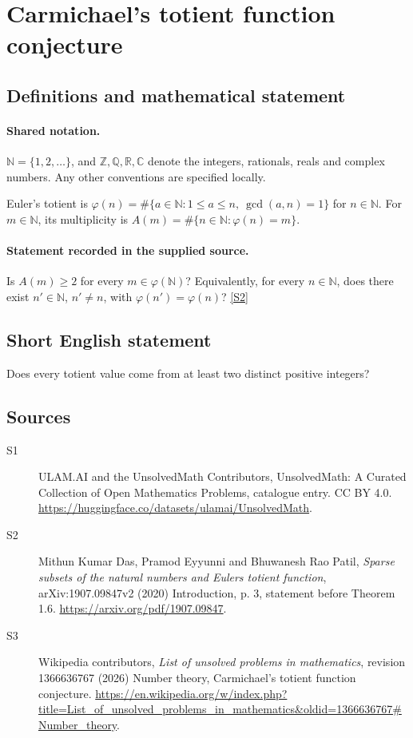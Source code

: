 \documentclass[11pt]{article}
\newcommand{\sref}[2]{\hyperlink{source:#1:#2}{[S#2]}}
\begin{document}
\section{Carmichael's totient function conjecture}\label{statement}

\subsection{Definitions and mathematical statement}

\paragraph{Shared notation.}$\mathbb N=\{1,2,\ldots\}$, and $\mathbb Z,\mathbb Q,\mathbb R,\mathbb C$ denote the integers, rationals, reals and complex numbers. Any other conventions are specified locally.


Euler's totient is $\varphi(n)=\#\{a\in\mathbb N:1\le a\le n,\ \gcd(a,n)=1\}$ for $n\in\mathbb N$. For $m\in\mathbb N$, its multiplicity is $A(m)=\#\{n\in\mathbb N:\varphi(n)=m\}$.
\paragraph{Statement recorded in the supplied source.}
Is $A(m)\ge2$ for every $m\in\varphi(\mathbb N)$? Equivalently, for every $n\in\mathbb N$, does there exist $n'\in\mathbb N$, $n'\ne n$, with $\varphi(n')=\varphi(n)$? \sref{statement}{2}
\subsection{Short English statement}
Does every totient value come from at least two distinct positive integers?
\subsection{Sources}
\begin{description}
\item[\hypertarget{source:statement:1}{S1}] ULAM.AI and the UnsolvedMath Contributors, UnsolvedMath: A Curated Collection of Open Mathematics Problems, catalogue entry. CC BY 4.0. \url{https://huggingface.co/datasets/ulamai/UnsolvedMath}.
\item[\hypertarget{source:statement:2}{S2}] Mithun Kumar Das, Pramod Eyyunni and Bhuwanesh Rao Patil, \emph{Sparse subsets of the natural numbers and Euler\textquotesingle s totient function}, arXiv:1907.09847v2 (2020) Introduction, p. 3, statement before Theorem 1.6. \url{https://arxiv.org/pdf/1907.09847}.
\item[\hypertarget{source:statement:3}{S3}] Wikipedia contributors, \emph{List of unsolved problems in mathematics}, revision 1366636767 (2026) Number theory, Carmichael's totient function conjecture. \url{https://en.wikipedia.org/w/index.php?title=List_of_unsolved_problems_in_mathematics&oldid=1366636767#Number_theory}.
\end{description}
\label{end:statement}
\end{document}

